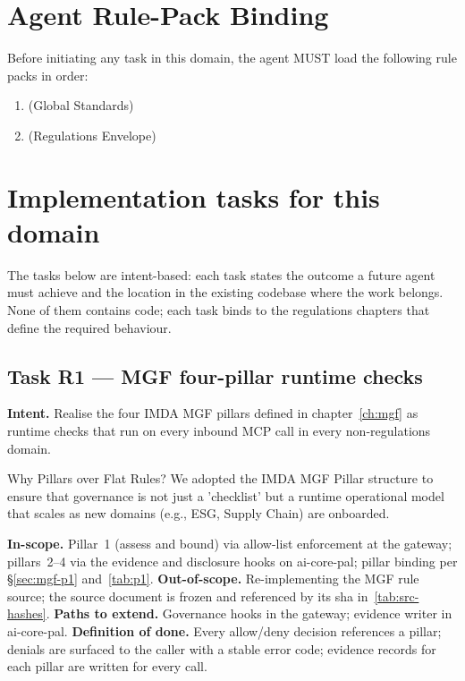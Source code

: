 \documentclass[11pt,a4paper,twoside]{report}
\begin{document}
\section{Agent Rule-Pack Binding}
\label{sec:agent-rule-binding}
Before initiating any task in this domain, the agent MUST load the following rule packs in order:
\begin{enumerate}
\item {} (Global Standards)
\item {} (Regulations Envelope)
\end{enumerate}

\section{Implementation tasks for this domain}
\label{sec:agent-tasks}
The tasks below are intent-based: each task states the outcome a
future agent must achieve and the location in the existing codebase
where the work belongs. None of them contains code; each task binds
to the regulations chapters that define the required behaviour.

\subsection*{Task R1 --- MGF four-pillar runtime checks}
\textbf{Intent.} Realise the four IMDA MGF pillars defined in
chapter~\ref{ch:mgf} as runtime checks that run on every inbound MCP
call in every non-regulations domain.

\begin{adrbox}{Why Pillars over Flat Rules?}
We adopted the IMDA MGF Pillar structure to ensure that governance is not just a 'checklist' but a runtime operational model that scales as new domains (e.g., ESG, Supply Chain) are onboarded.
\end{adrbox}

\textbf{In-scope.} Pillar~1 (assess and bound) via allow-list
enforcement at the gateway; pillars~2--4 via the evidence and
disclosure hooks on ai-core-pal; pillar binding per
\S\ref{sec:mgf-p1} and~\ref{tab:p1}.
\textbf{Out-of-scope.} Re-implementing the MGF rule source; the
source document is frozen and referenced by its sha in~\ref{tab:src-hashes}.
\textbf{Paths to extend.} Governance hooks in the gateway; evidence
writer in ai-core-pal.
\textbf{Definition of done.} Every allow/deny decision references a
pillar; denials are surfaced to the caller with a stable error code;
evidence records for each pillar are written for every call.
\end{document}
